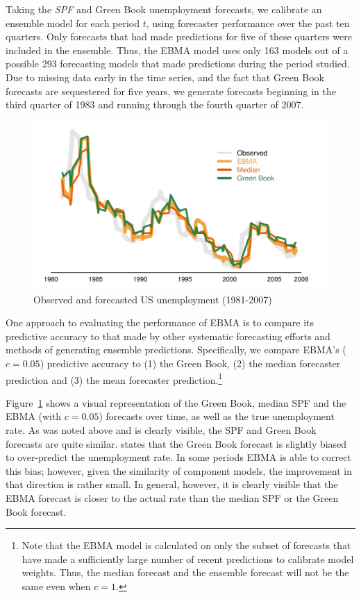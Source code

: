 \documentclass[12pt,fullpage,endnotes]{article}
\begin{document}
Taking the \textit{SPF} and Green Book unemployment forecasts, we
calibrate an ensemble model for each period $t$, using forecaster
performance over the past ten quarters.  Only forecasts that had made
predictions for five of these quarters were included in the ensemble.
Thus, the EBMA model uses only 163 models out of a possible 293
forecasting models that made predictions during the period studied.
Due to missing data early in the time series, and the fact that Green
Book forecasts are sequestered for five years, we generate forecasts
beginning in the third quarter of 1983 and running through the fourth
quarter of 2007.



\begin{figure}[h]
\caption{Observed and forecasted US unemployment (1981-2007)}
\label{timeSeries}
\begin{center}
\includegraphics[scale=.8]{mdwtimeSeries2}
\end{center}
\end{figure}


One approach to evaluating the performance of EBMA is to compare its
predictive accuracy to that made by other systematic forecasting
efforts and methods of generating ensemble predictions.  Specifically,
we compare EBMA's ($c=0.05$) predictive accuracy to (1) the Green
Book, (2) the median forecaster prediction and (3) the mean forecaster
prediction.\footnote{Note that the EBMA model is calculated on only
  the subset of forecasts that have made a sufficiently large number
  of recent predictions to calibrate model weights.  Thus, the median
  forecast and the ensemble forecast will not be the same even when
  $c=1$.} 

Figure~\ref{timeSeries} shows a visual representation of the
Green Book, median SPF and the EBMA (with $c=0.05$) forecasts over
time, as well as the true unemployment rate. As was noted above and is
clearly visible, the SPF and Green Book forecasts are quite
similar. \citet{Baghestani:2008} states that the Green Book forecast is
slightly biased to over-predict the unemployment rate. In some periods
EBMA is able to correct this bias; however, given the similarity of
component models, the improvement in that direction is rather
small. In general, however, it is clearly visible that the EBMA
forecast is closer to the actual rate than the median SPF or the Green
Book forecast.
\end{document}
